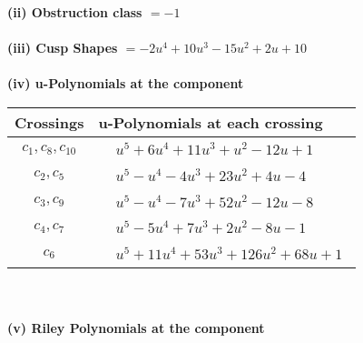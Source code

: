 \documentclass[1p]{elsarticle_modified}
\theoremstyle{definition}
\begin{document}
\flushleft \textbf{(ii) Obstruction class $= -1$}\\~\\
\flushleft \textbf{(iii) Cusp Shapes $= -2 u^4+10 u^3-15 u^2+2 u+10$}\\~\\
\newpage\renewcommand{\arraystretch}{1}
\flushleft \textbf{(iv) u-Polynomials at the component}\newline \\
\begin{tabular}{m{50pt}|m{274pt}}
Crossings & \hspace{64pt}u-Polynomials at each crossing \\
\hline $$\begin{aligned}c_{1},c_{8},c_{10}\end{aligned}$$&$\begin{aligned}
&u^5+6 u^4+11 u^3+u^2-12 u+1
\end{aligned}$\\
\hline $$\begin{aligned}c_{2},c_{5}\end{aligned}$$&$\begin{aligned}
&u^5- u^4-4 u^3+23 u^2+4 u-4
\end{aligned}$\\
\hline $$\begin{aligned}c_{3},c_{9}\end{aligned}$$&$\begin{aligned}
&u^5- u^4-7 u^3+52 u^2-12 u-8
\end{aligned}$\\
\hline $$\begin{aligned}c_{4},c_{7}\end{aligned}$$&$\begin{aligned}
&u^5-5 u^4+7 u^3+2 u^2-8 u-1
\end{aligned}$\\
\hline $$\begin{aligned}c_{6}\end{aligned}$$&$\begin{aligned}
&u^5+11 u^4+53 u^3+126 u^2+68 u+1
\end{aligned}$\\
\hline
\end{tabular}\\~\\
\newpage\renewcommand{\arraystretch}{1}
\flushleft \textbf{(v) Riley Polynomials at the component}\newline \\
\end{document}
